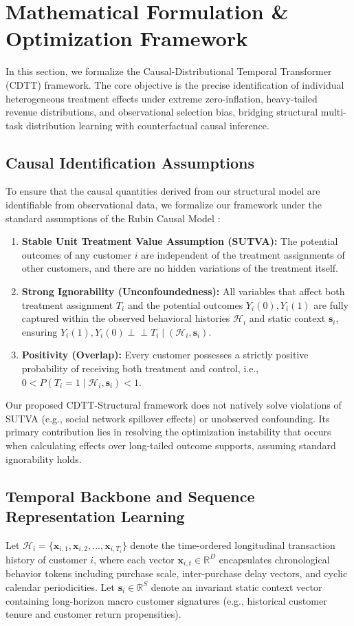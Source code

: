 \documentclass[10pt, conference]{IEEEtran}
\newcommand{\ourmodel}{CDTT}
\begin{document}
\section{Mathematical Formulation \& Optimization Framework}
\label{sec:methodology}

In this section, we formalize the Causal-Distributional Temporal Transformer (\ourmodel) framework. The core objective is the precise identification of individual heterogeneous treatment effects under extreme zero-inflation, heavy-tailed revenue distributions, and observational selection bias, bridging structural multi-task distribution learning with counterfactual causal inference.

\subsection{Causal Identification Assumptions}
To ensure that the causal quantities derived from our structural model are identifiable from observational data, we formalize our framework under the standard assumptions of the Rubin Causal Model \cite{Rubin1974}:
\begin{enumerate}
    \item \textbf{Stable Unit Treatment Value Assumption (SUTVA):} The potential outcomes of any customer $i$ are independent of the treatment assignments of other customers, and there are no hidden variations of the treatment itself.
    \item \textbf{Strong Ignorability (Unconfoundedness):} All variables that affect both treatment assignment $T_i$ and the potential outcomes $Y_i(0), Y_i(1)$ are fully captured within the observed behavioral histories $\mathcal{H}_i$ and static context $\mathbf{s}_i$, ensuring $Y_i(1), Y_i(0) \perp \!\!\! \perp T_i \mid (\mathcal{H}_i, \mathbf{s}_i)$.
    \item \textbf{Positivity (Overlap):} Every customer possesses a strictly positive probability of receiving both treatment and control, i.e., $0 < P(T_i = 1 \mid \mathcal{H}_i, \mathbf{s}_i) < 1$.
\end{enumerate}
Our proposed \ourmodel-Structural framework does not natively solve violations of SUTVA (e.g., social network spillover effects) or unobserved confounding. Its primary contribution lies in resolving the optimization instability that occurs when calculating effects over long-tailed outcome supports, assuming standard ignorability holds.

\subsection{Temporal Backbone and Sequence Representation Learning}
Let $\mathcal{H}_i = \{\mathbf{x}_{i,1}, \mathbf{x}_{i,2}, \dots, \mathbf{x}_{i,T_i}\}$ denote the time-ordered longitudinal transaction history of customer $i$, where each vector $\mathbf{x}_{i,t} \in \mathbb{R}^D$ encapsulates chronological behavior tokens including purchase scale, inter-purchase delay vectors, and cyclic calendar periodicities. Let $\mathbf{s}_i \in \mathbb{R}^S$ denote an invariant static context vector containing long-horizon macro customer signatures (e.g., historical customer tenure and customer return propensities). 
\end{document}
